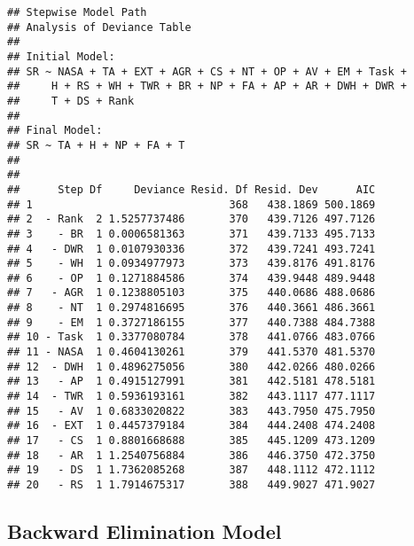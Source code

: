 \documentclass[]{article}
\begin{document}
\begin{verbatim}
## Stepwise Model Path 
## Analysis of Deviance Table
## 
## Initial Model:
## SR ~ NASA + TA + EXT + AGR + CS + NT + OP + AV + EM + Task + 
##     H + RS + WH + TWR + BR + NP + FA + AP + AR + DWH + DWR + 
##     T + DS + Rank
## 
## Final Model:
## SR ~ TA + H + NP + FA + T
## 
## 
##      Step Df     Deviance Resid. Df Resid. Dev      AIC
## 1                               368   438.1869 500.1869
## 2  - Rank  2 1.5257737486       370   439.7126 497.7126
## 3    - BR  1 0.0006581363       371   439.7133 495.7133
## 4   - DWR  1 0.0107930336       372   439.7241 493.7241
## 5    - WH  1 0.0934977973       373   439.8176 491.8176
## 6    - OP  1 0.1271884586       374   439.9448 489.9448
## 7   - AGR  1 0.1238805103       375   440.0686 488.0686
## 8    - NT  1 0.2974816695       376   440.3661 486.3661
## 9    - EM  1 0.3727186155       377   440.7388 484.7388
## 10 - Task  1 0.3377080784       378   441.0766 483.0766
## 11 - NASA  1 0.4604130261       379   441.5370 481.5370
## 12  - DWH  1 0.4896275056       380   442.0266 480.0266
## 13   - AP  1 0.4915127991       381   442.5181 478.5181
## 14  - TWR  1 0.5936193161       382   443.1117 477.1117
## 15   - AV  1 0.6833020822       383   443.7950 475.7950
## 16  - EXT  1 0.4457379184       384   444.2408 474.2408
## 17   - CS  1 0.8801668688       385   445.1209 473.1209
## 18   - AR  1 1.2540756884       386   446.3750 472.3750
## 19   - DS  1 1.7362085268       387   448.1112 472.1112
## 20   - RS  1 1.7914675317       388   449.9027 471.9027
\end{verbatim}

\newpage

\hypertarget{backward-elimination-model}{%
\subsection{Backward Elimination
Model}\label{backward-elimination-model}}
\end{document}
